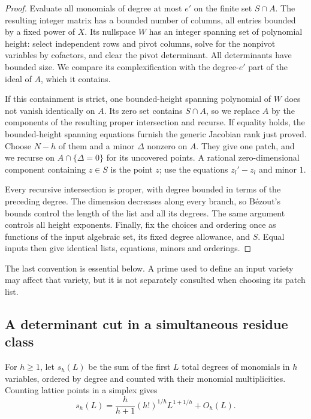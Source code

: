 \begin{proof}
Evaluate all monomials of degree at most $e'$ on the finite set
$S\cap A$.  The resulting integer matrix has a bounded number of
columns, all entries bounded by a fixed power of $X$.  Its nullspace
$W$ has an integer spanning set of polynomial height: select independent
rows and pivot columns, solve for the nonpivot variables by cofactors,
and clear the pivot determinant.  All determinants have bounded size.
We compare its complexification with the degree-$e'$ part of the ideal
of $A$, which it contains.

If this containment is strict, one bounded-height spanning polynomial
of $W$ does not vanish identically on $A$.  Its zero set contains
$S\cap A$, so we replace $A$ by the components of the resulting proper
intersection and recurse.  If equality holds, the bounded-height
spanning equations furnish the generic Jacobian rank just proved.
Choose $N-h$ of them and a minor $\Delta$ nonzero on $A$.  They give
one patch, and we recurse on $A\cap\{\Delta=0\}$ for its uncovered
points.  A rational zero-dimensional component containing $z\in S$
is the point $z$; use the equations $z_l'-z_l$ and minor $1$.

Every recursive intersection is proper, with degree bounded in terms
of the preceding degree.  The dimension decreases along every branch,
so B\'ezout's bounds control the length of the list and all its degrees.
The same argument controls all height exponents.  Finally, fix the
choices and ordering once as functions of the input algebraic set,
its fixed degree allowance, and $S$.  Equal inputs then give identical
lists, equations, minors and orderings.
\end{proof}

The last convention is essential below.  A prime used to define an
input variety may affect that variety, but it is not separately
consulted when choosing its patch list.

\subsection{A determinant cut in a simultaneous residue class}

For $h\ge1$, let $s_h(L)$ be the sum of the first $L$ total degrees
of monomials in $h$ variables, ordered by degree and counted with their
monomial multiplicities.  Counting lattice points in a simplex gives
\begin{equation}\label{eq:affine-local-orders}
 s_h(L)=\frac{h}{h+1}(h!)^{1/h}L^{1+1/h}+O_h(L).
\end{equation}


